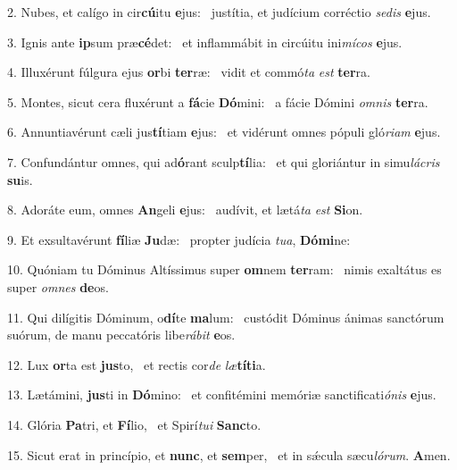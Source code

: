 2. Nubes, et calígo in cir\textbf{cú}itu \textbf{e}jus: \ast\  justítia, et judícium corréctio \textit{se}\textit{dis} \textbf{e}jus.\

3. Ignis ante \textbf{ip}sum præ\textbf{cé}det: \ast\  et inflammábit in circúitu ini\textit{mí}\textit{cos} \textbf{e}jus.\

4. Illuxérunt fúlgura ejus \textbf{or}bi \textbf{ter}ræ: \ast\  vidit et commó\textit{ta} \textit{est} \textbf{ter}ra.\

5. Montes, sicut cera fluxérunt a \textbf{fá}cie \textbf{Dó}mini: \ast\  a fácie Dómini \textit{om}\textit{nis} \textbf{ter}ra.\

6. Annuntiavérunt cæli jus\textbf{tí}tiam \textbf{e}jus: \ast\  et vidérunt omnes pópuli gló\textit{ri}\textit{am} \textbf{e}jus.\

7. Confundántur omnes, qui ad\textbf{ó}rant sculp\textbf{tí}lia: \ast\  et qui gloriántur in simu\textit{lá}\textit{cris} \textbf{su}is.\

8. Adoráte eum, omnes \textbf{An}geli \textbf{e}jus: \ast\  audívit, et lætá\textit{ta} \textit{est} \textbf{Si}on.\

9. Et exsultavérunt \textbf{fí}liæ \textbf{Ju}dæ: \ast\  propter judícia \textit{tu}\textit{a}, \textbf{Dó}\textbf{mi}ne:\

10. Quóniam tu Dóminus Altíssimus super \textbf{om}nem \textbf{ter}ram: \ast\  nimis exaltátus es super \textit{om}\textit{nes} \textbf{de}os.\

11. Qui dilígitis Dóminum, o\textbf{dí}te \textbf{ma}lum: \ast\  custódit Dóminus ánimas sanctórum suórum, de manu peccatóris libe\textit{rá}\textit{bit} \textbf{e}os.\

12. Lux \textbf{or}ta est \textbf{jus}to, \ast\  et rectis cor\textit{de} \textit{læ}\textbf{tí}\textbf{ti}a.\

13. Lætámini, \textbf{jus}ti in \textbf{Dó}mino: \ast\  et confitémini memóriæ sanctificati\textit{ó}\textit{nis} \textbf{e}jus.\

14. Glória \textbf{Pa}tri, et \textbf{Fí}lio, \ast\  et Spirí\textit{tu}\textit{i} \textbf{Sanc}to.\

15. Sicut erat in princípio, et \textbf{nunc}, et \textbf{sem}per, \ast\  et in sǽcula sæcu\textit{ló}\textit{rum}. \textbf{A}men.\

